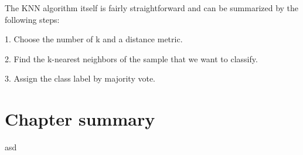 The KNN algorithm itself is fairly straightforward and can be summarized by the following steps:

1. Choose the number of k and a distance metric.

2. Find the k-nearest neighbors of the sample that we want to classify.

3. Assign the class label by majority vote.

\section{Chapter summary} \label{sec:ml_workflow_summary}
asd
